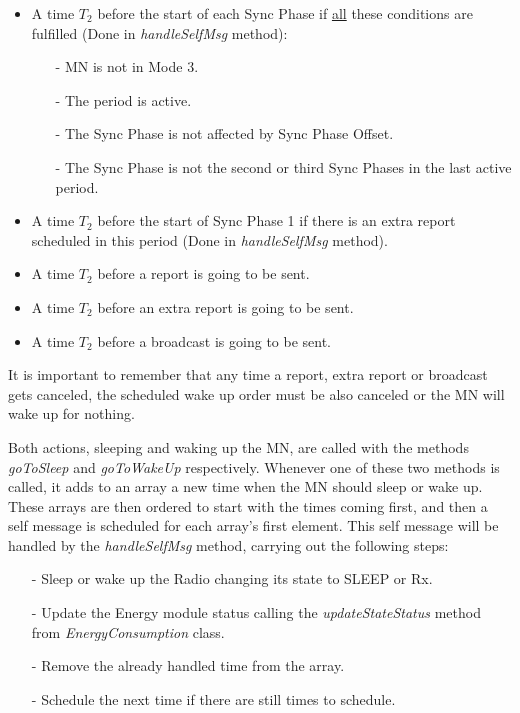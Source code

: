 \begin{itemize}
  \item A time $T_2$ before the start of each Sync Phase if \underline{all} these conditions are fulfilled (Done in \textit{handleSelfMsg} method):
    \begin{itemize}
      \item[-] \ac{MN} is not in Mode 3.
      \item[-] The period is active.
      \item[-] The Sync Phase is not affected by Sync Phase Offset.
      \item[-] The Sync Phase is not the second or third Sync Phases in the last active period.
    \end{itemize}
  
  \item A time $T_2$ before the start of Sync Phase 1 if there is an extra report scheduled in this period (Done in \textit{handleSelfMsg} method).
  
  \item A time $T_2$ before a report is going to be sent.

  \item A time $T_2$ before an extra report is going to be sent.

  \item A time $T_2$ before a broadcast is going to be sent.
\end{itemize}

It is important to remember that any time a report, extra report or broadcast gets canceled, the scheduled wake up order must be also canceled 
or the \ac{MN} will wake up for nothing.

Both actions, sleeping and waking up the \ac{MN}, are called with the methods \textit{goToSleep} and \textit{goToWakeUp} respectively. Whenever
one of these two methods is called, it adds to an array a new time when the \ac{MN} should sleep or wake up. These arrays are then ordered to 
start with the times coming first, and then a self message is scheduled for each array's first element. This self message will be handled by the 
\textit{handleSelfMsg} method, carrying out the following steps:
\begin{itemize}
 \item[-] Sleep or wake up the Radio changing its state to SLEEP or \ac{Rx}.
 
 \item[-] Update the Energy module status calling the \textit{updateStateStatus} method from \textit{EnergyConsumption} class.

 \item[-] Remove the already handled time from the array.

 \item[-] Schedule the next time if there are still times to schedule.
\end{itemize}



